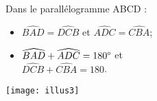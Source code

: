 	\begin{myex}
		\begin{multicols}{2}
			Dans le parallélogramme ABCD :
			\begin{itemize}
				\item $\widehat{BAD} = \widehat{DCB}$ et $\widehat{ADC} = \widehat{CBA}$;
				\item $\widehat{BAD} + \widehat{ADC} = 180\degree$  et \\ $\widehat{DCB} + \widehat{CBA} = 180$\degree.
				
			\end{itemize}
			
			
			
			\begin{center}
				\texttt{[image: illus3]}
			\end{center}
		\end{multicols}
	\end{myex}